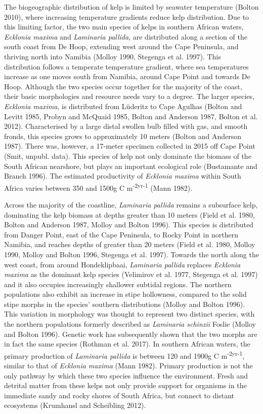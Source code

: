 \documentclass[utf8]{frontiersSCNS} %
\begin{document}
The biogeographic distribution of kelp is limited by seawater temperature (Bolton 2010), where increasing temperature gradients reduce kelp distribution. Due to this limiting factor, the two main species of kelps in southern African waters, \emph{Ecklonia maxima} and \emph{Laminaria pallida}, are distributed along a section of the south coast from De Hoop, extending west around the Cape Peninsula, and thriving north into Namibia (Molloy 1990, Stegenga et al. 1997). This distribution follows a temperate temperature gradient, where sea temperatures increase as one moves south from Namibia, around Cape Point and towards De Hoop. Although the two species occur together for the majority of the coast, their basic morphologies and resource needs vary to a degree. The larger species, \emph{Ecklonia maxima}, is distributed from Lüderitz to Cape Agulhas (Bolton and Levitt 1985, Probyn and McQuaid 1985, Bolton and Anderson 1987, Bolton et al. 2012). Characterised by a large distal swollen bulb filled with gas, and smooth fronds, this species grows to approximately 10 meters (Bolton and Anderson 1987). There was, however, a 17-meter specimen collected in 2015 off Cape Point (Smit, unpubl. data). This species of kelp not only dominate the biomass of the South African nearshore, but plays an important ecological role (Bustamante and Branch 1996). The estimated productivity of \emph{Ecklonia maxima} within South Africa varies between 350 and 1500g C m\textsuperscript{-2yr-1} (Mann 1982).

Across the majority of the coastline, \emph{Laminaria pallida} remains a subsurface kelp, dominating the kelp biomass at depths greater than 10 meters (Field et al. 1980, Bolton and Anderson 1987, Molloy and Bolton 1996). This species is distributed from Danger Point, east of the Cape Peninsula, to Rocky Point in northern Namibia, and reaches depths of greater than 20 meters (Field et al. 1980, Molloy 1990, Molloy and Bolton 1996, Stegenga et al. 1997). Towards the north along the west coast, from around Hondeklipbaai, \emph{Laminaria pallida} replaces \emph{Ecklonia maxima} as the dominant kelp species (Velimirov et al. 1977, Stegenga et al. 1997) and it also occupies increasingly shallower subtidal regions. The northern populations also exhibit an increase in stipe hollowness, compared to the solid stipe morphs in the species' southern distributions (Molloy and Bolton 1996). This variation in morphology was thought to represent two distinct species, with the northern populations formerly described as \emph{Laminaria schinzii} Foslie (Molloy and Bolton 1996). Genetic work has subsequently shown that the two morphs are in fact the same species (Rothman et al. 2017). In southern African waters, the primary production of \emph{Laminaria pallida} is between 120 and 1900g C m\textsuperscript{-2yr-1}, similar to that of \emph{Ecklonia maxima} (Mann 1982). Primary production is not the only pathway by which these two species influence the environment. Fresh and detrital matter from these kelps not only provide support for organisms in the immediate sandy and rocky shores of South Africa, but connect to distant ecosystems (Krumhansl and Scheibling 2012).
\end{document}
